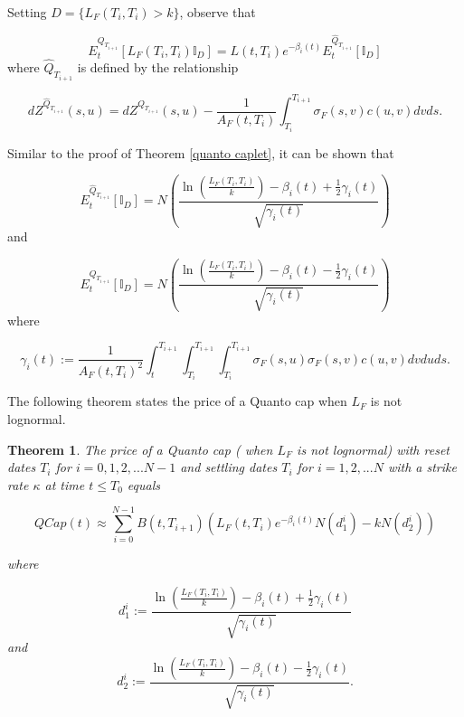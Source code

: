 \documentclass[11pt]{article}
\newtheorem{theorem}{Theorem}[section]
\begin{document}
Setting $D=\{L_F(T_i,T_i)>k\}$, observe that

\begin{equation}
    E_t^{Q_{T_{i+1}}}[L_F(T_i,T_i)\mathbb{I}_D]=L(t,T_i)e^{-\beta_i(t)} E_t^{\hat{Q}_{T_{i+1}}}[\mathbb{I}_D]
\end{equation}
where $\hat{Q}_{T_{i+1}}$ is defined by the relationship 

\begin{equation}
    dZ^{\hat{Q}_{T_{i+1}}}(s,u)=dZ^{{Q}_{T_{i+1}}}(s,u)-\frac{1}{A_F(t,T_i)}\int_{T_i}^{T_{i+1}}\sigma_F(s,v)c(u,v)dvds.
\end{equation}

Similar to the proof of Theorem \ref{quanto caplet}, it can be shown that 

\begin{equation*}
    E_t^{\hat{Q}_{T_{i+1}}}[\mathbb{I}_D]=N\left(\frac{\ln\left(\frac{L_F(T_i,T_i)}{k}\right) -\beta_i(t)+\frac{1}{2}\gamma_i(t)}{\sqrt{\gamma_i(t)}}\right)
\end{equation*}
and 

\begin{equation*}
     E_t^{{Q}_{T_{i+1}}}[\mathbb{I}_D]=N\left(\frac{\ln\left(\frac{L_F(T_i,T_i)}{k}\right) -\beta_i(t)-\frac{1}{2}\gamma_i(t)}{\sqrt{\gamma_i(t)}}\right)
\end{equation*}
where 

\begin{equation*}
    \gamma_i(t):=\frac{1}{A_F(t,T_i)^2}\int_t^{T_{i+1}}\int_{T_i}^{T_{i+1}}\int_{T_i}^{T_{i+1}}\sigma_F(s,u)\sigma_{F}(s,v)c(u,v)dvduds.
\end{equation*}

The following theorem states the price of a Quanto cap when $L_F$ is not lognormal. 
\begin{theorem} 

The price of a Quanto cap ( when $L_F$ is not lognormal) with reset dates $T_{i}$ for $i=0,1,2,...N-1$ and settling dates $T_i$ for $i=1,2,...N$ with a strike rate $\kappa$ at time $t\leq T_0$ equals

\begin{equation*}
    QCap(t)\approx\sum_{i=0}^{N-1}B(t,T_{i+1})(L_F(t,T_i)e^{-\beta_i(t)}N(d_1^i)-kN(d_2^i))
\end{equation*}

where 

\begin{equation*}
    d_1^i:=\frac{\ln\left(\frac{L_F(T_i,T_i)}{k}\right) -\beta_i(t)+\frac{1}{2}\gamma_i(t)}{\sqrt{\gamma_i(t)}}
\end{equation*}
 and 
 \begin{equation*}
    d_2^i:=\frac{\ln\left(\frac{L_F(T_i,T_i)}{k}\right) -\beta_i(t)-\frac{1}{2}\gamma_i(t)}{\sqrt{\gamma_i(t)}}.
\end{equation*}
 

\end{theorem}
\end{document}
